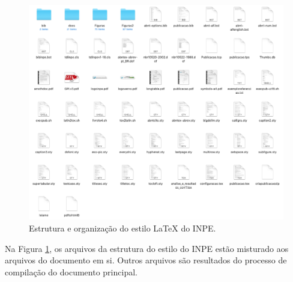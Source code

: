 \begin{figure}[H]
    \centering
    \includegraphics[scale=0.4]{./figs/estrutura_estilo_inpe.png}
    \caption{Estrutura e organização do estilo LaTeX do INPE.}
    \label{fig:estrut}
\end{figure}

Na Figura \ref{fig:estrut}, os arquivos da estrutura do estilo do INPE estão misturado aos arquivos do documento em si. Outros arquivos são resultados do processo de compilação do documento principal.

